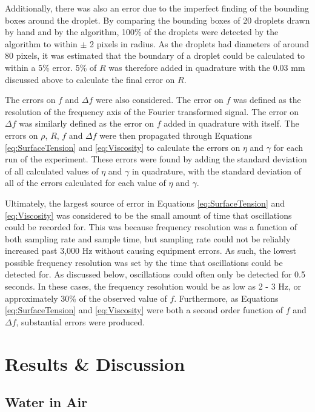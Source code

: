 \documentclass{physics_article_B}
\begin{document}
    Additionally, there was also an error due to the imperfect finding of the bounding boxes around the droplet. By comparing the bounding boxes of 20 droplets drawn by hand and by the algorithm, 100\% of the droplets were detected by the algorithm to within $\pm$ 2 pixels in radius. As the droplets had diameters of around 80 pixels, it was estimated that the boundary of a droplet could be calculated to within a 5\% error. 5\% of $R$ was therefore added in quadrature with the 0.03 mm discussed above to calculate the final error on $R$. 
    
    The errors on $f$ and $\Delta f$ were also considered. The error on $f$ was defined as the resolution of the frequency axis of the Fourier transformed signal. The error on $\Delta f$ was similarly defined as the error on $f$ added in quadrature with itself. The errors on $\rho$, $R$, $f$ and $\Delta f$ were then propagated through Equations \ref{eq:SurfaceTension} and \ref{eq:Viscosity} to calculate the errors on $\eta$ and $\gamma$ for each run of the experiment. These errors were found by adding the standard deviation of all calculated values of $\eta$ and $\gamma$ in quadrature, with the standard deviation of all of the errors calculated for each value of $\eta$ and $\gamma$.
    
    Ultimately, the largest source of error in Equations \ref{eq:SurfaceTension} and \ref{eq:Viscosity} was considered to be the small amount of time that oscillations could be recorded for. This was because frequency resolution was a function of both sampling rate and sample time, but sampling rate could not be reliably increased past 3,000 Hz without causing equipment errors. As such, the lowest possible frequency resolution was set by the time that oscillations could be detected for. As discussed below, oscillations could often only be detected for 0.5 seconds. In these cases, the frequency resolution would be as low as 2 - 3 Hz, or approximately 30\% of the observed value of $f$. Furthermore, as Equations \ref{eq:SurfaceTension} and \ref{eq:Viscosity} were both a second order function of $f$ and $\Delta f$, substantial errors were produced. 
    
\section{Results \& Discussion\label{sect:results}}

    \subsection{Water in Air\label{sect:results:WaterInAir}}
     
\end{document}
